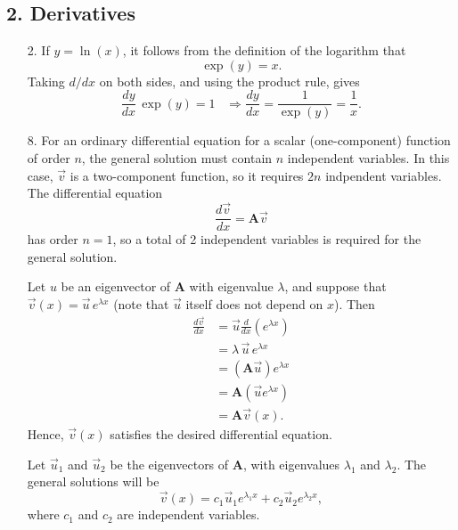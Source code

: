 \documentclass[10pt,a4paper]{article}
\begin{document}
\subsection*{2. Derivatives}

\begin{enumerate}
\item[2.]
If $y = \ln(x)$, it follows from the definition of the logarithm that
\begin{equation}
  \exp(y) = x.
\end{equation}
Taking $d/dx$ on both sides, and using the product rule, gives
\begin{equation}
  \frac{dy}{dx} \, \exp(y) = 1 \;\;\; \Rightarrow \frac{dy}{dx} = \frac{1}{\exp(y)} = \frac{1}{x}.
\end{equation}

\item[8.]
For an ordinary differential equation for a scalar (one-component)
function of order $n$, the general solution must contain $n$
independent variables. In this case, $\vec{v}$ is a two-component
function, so it requires $2n$ indpendent variables. The differential
equation
\begin{equation}
  \frac{d\vec{v}}{dx} = \mathbf{A} \vec{v}
\end{equation}
has order $n = 1$, so a total of 2 independent variables is required
for the general solution.

Let $u$ be an eigenvector of $\mathbf{A}$ with eigenvalue $\lambda$,
and suppose that $\vec{v}(x) = \vec{u}\,e^{\lambda x}$ (note that
$\vec{u}$ itself does not depend on $x$). Then
\begin{align}
  \frac{d\vec{v}}{dx} &= \vec{u} \frac{d}{dx}\left(e^{\lambda x}\right) \\
  &= \lambda \, \vec{u}\, e^{\lambda x} \\
  &= \left(\mathbf{A} \vec{u}\right) e^{\lambda x} \\
  &= \mathbf{A} \left(\vec{u} e^{\lambda x}\right) \\
  &= \mathbf{A} \vec{v}(x).
\end{align}
Hence, $\vec{v}(x)$ satisfies the desired differential equation.

Let $\vec{u}_1$ and $\vec{u}_2$ be the eigenvectors of $\mathbf{A}$,
with eigenvalues $\lambda_1$ and $\lambda_2$. The general solutions
will be
\begin{equation}
  \vec{v}(x) = c_1 \vec{u}_1 e^{\lambda_1 x} + c_2 \vec{u}_2 e^{\lambda_2 x},
\end{equation}
where $c_1$ and $c_2$ are independent variables.
\end{enumerate}
\end{document}
